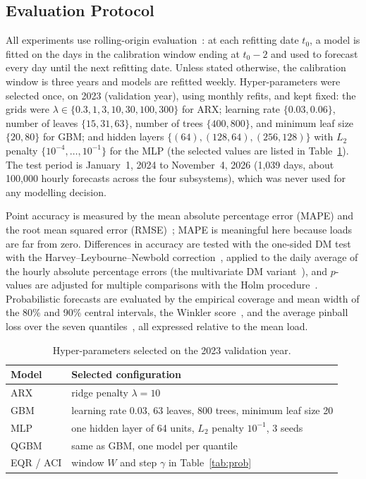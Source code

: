 \subsection{Evaluation Protocol}
\label{sec:protocol}
All experiments use rolling-origin evaluation~\cite{bergmeir2012cv}: at each refitting date $t_0$, a model is fitted on the days in the calibration window ending at $t_0-2$ and used to forecast every day until the next refitting date. Unless stated otherwise, the calibration window is three years and models are refitted weekly. Hyper-parameters were selected once, on 2023 (validation year), using monthly refits, and kept fixed: the grids were $\lambda\in\{0.3,1,3,10,30,100,300\}$ for ARX; learning rate $\{0.03,0.06\}$, number of leaves $\{15,31,63\}$, number of trees $\{400,800\}$, and minimum leaf size $\{20,80\}$ for GBM; and hidden layers $\{(64),(128,64),(256,128)\}$ with $L_2$ penalty $\{10^{-4},\dots,10^{-1}\}$ for the MLP (the selected values are listed in Table~\ref{tab:hyper}). The test period is January~1, 2024 to November~4, 2026 (1,039 days, about 100{,}000 hourly forecasts across the four subsystems), which was never used for any modelling decision.

Point accuracy is measured by the mean absolute percentage error (MAPE) and the root mean squared error (RMSE)~\cite{hyndman2006accuracy}; MAPE is meaningful here because loads are far from zero. Differences in accuracy are tested with the one-sided DM test~\cite{diebold1995dm} with the Harvey--Leybourne--Newbold correction~\cite{harvey1997hln}, applied to the daily average of the hourly absolute percentage errors (the multivariate DM variant~\cite{ziel2018multivariate}), and $p$-values are adjusted for multiple comparisons with the Holm procedure~\cite{holm1979}. Probabilistic forecasts are evaluated by the empirical coverage and mean width of the 80\% and 90\% central intervals, the Winkler score~\cite{winkler1972interval}, and the average pinball loss over the seven quantiles~\cite{gneiting2007scoring}, all expressed relative to the mean load.

\begin{table}[!t]
\caption{Hyper-parameters selected on the 2023 validation year.}
\label{tab:hyper}
\centering
\setlength{\tabcolsep}{4pt}
\begin{tabular}{lp{}}
\toprule
Model & Selected configuration \\
\midrule
ARX & ridge penalty $\lambda=10$ \\
GBM & learning rate 0.03, 63 leaves, 800 trees, minimum leaf size 20 \\
MLP & one hidden layer of 64 units, $L_2$ penalty $10^{-1}$, 3 seeds \\
QGBM & same as GBM, one model per quantile \\
EQR / ACI & window $W$ and step $\gamma$ in Table~\ref{tab:prob} \\
\bottomrule
\end{tabular}
\end{table}

